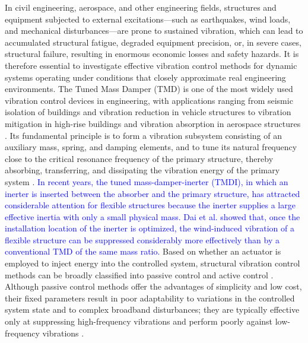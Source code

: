 \documentclass[review]{elsarticle}
\begin{document}
In civil engineering, aerospace, and other engineering fields, structures and equipment subjected to external excitations—such as earthquakes, wind loads, and mechanical disturbances—are prone to sustained vibration, which can lead to accumulated structural fatigue, degraded equipment precision, or, in severe cases, structural failure, resulting in enormous economic losses and safety hazards.
It is therefore essential to investigate effective vibration control methods for dynamic systems operating under conditions that closely approximate real engineering environments.
The Tuned Mass Damper (TMD) is one of the most widely used vibration control devices in engineering, with applications ranging from seismic isolation of buildings \citep{kang_seismic_2023,pandit_optimization_2024,xiang_pendulum_2024,djerouni_multi-tuned_2025,galoshejerdi_design_2025} and vibration reduction in vehicle structures \citep{bein_smart_2008} to vibration mitigation in high-rise buildings \citep{alibabaei_damage-based_2023,xu_dynamic_2024,Lu_particle_2025} and vibration absorption in aerospace structures \citep{gasparetto_MultiObjective_2023,sun_Coupled_2024}.
Its fundamental principle is to form a vibration subsystem consisting of an auxiliary mass, spring, and damping elements, and to tune its natural frequency close to the critical resonance frequency of the primary structure, thereby absorbing, transferring, and dissipating the vibration energy of the primary system \citep{nagarajaiah_adaptive_2009}.
\textcolor{blue}{In recent years, the tuned mass-damper-inerter (TMDI), in which an inerter is inserted between the absorber and the primary structure, has attracted considerable attention for flexible structures because the inerter supplies a large effective inertia with only a small physical mass. Dai et al. \citep{dai_tuned_2019} showed that, once the installation location of the inerter is optimized, the wind-induced vibration of a flexible structure can be suppressed considerably more effectively than by a conventional TMD of the same mass ratio.}
Based on whether an actuator is employed to inject energy into the controlled system, structural vibration control methods can be broadly classified into passive control and active control \citep{sun_2024_active}.
Although passive control methods offer the advantages of simplicity and low cost, their fixed parameters result in poor adaptability to variations in the controlled system state and to complex broadband disturbances; they are typically effective only at suppressing high-frequency vibrations and perform poorly against low-frequency vibrations \citep{wang_latching_2025}.
\end{document}

